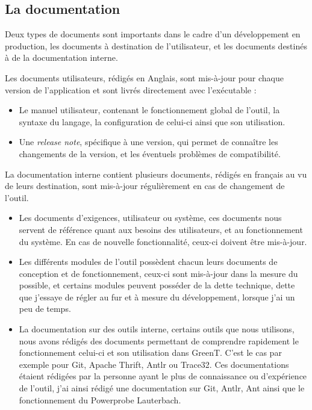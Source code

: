 \subsection{La documentation}
Deux types de documents sont importants dans le cadre d'un développement en production, les documents à destination de l'utilisateur, et les documents destinés à de la documentation interne. 

Les documents utilisateurs, rédigés en Anglais, sont mis-à-jour pour chaque version de l'application et sont livrés directement avec l'exécutable : 
\begin{itemize}
	\item Le manuel utilisateur, contenant le fonctionnement global de l'outil, la syntaxe du langage, la configuration de celui-ci ainsi que son utilisation.
	\item Une \textit{release note}, spécifique à une version, qui permet de connaître les changements de la version, et les éventuels problèmes de compatibilité.\newline
\end{itemize}

La documentation interne contient plusieurs documents, rédigés en français au vu de leurs destination, sont mis-à-jour régulièrement en cas de changement de l'outil.
\begin{itemize}
	\item Les documents d'exigences, utilisateur ou système, ces documents nous servent de référence quant aux besoins des utilisateurs, et au fonctionnement du système. En cas de nouvelle fonctionnalité, ceux-ci doivent être mis-à-jour.
	\item Les différents modules de l'outil possèdent chacun leurs documents de conception et de fonctionnement, ceux-ci sont mis-à-jour dans la mesure du possible, et certains modules peuvent posséder de la dette technique, dette que j'essaye de régler au fur et à mesure du développement, lorsque j'ai un peu de temps.
	\item La documentation sur des outils interne, certains outils que nous utilisons, nous avons rédigés des documents permettant de comprendre rapidement le fonctionnement celui-ci et son utilisation dans GreenT. C'est le cas par exemple pour Git, Apache Thrift, Antlr ou Trace32. Ces documentations étaient rédigées par la personne ayant le plus de connaissance ou d'expérience de l'outil, j'ai ainsi rédigé une documentation sur Git, Antlr, Ant ainsi que le fonctionnement du Powerprobe Lauterbach.
\end{itemize}

